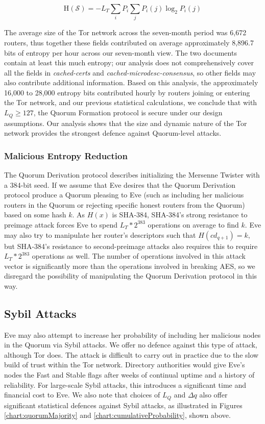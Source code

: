 \begin{equation}
\mathrm{H}(\mathcal{S}) = - L_{T} \sum_{i} P_{i} \sum_{j} P_{i}(j) \log_{2}P_{i}(j)
\label{eq:entropyRate}
\end{equation}

The average size of the Tor network across the seven-month period was 6,672 routers, thus together these fields contributed on average approximately 8,896.7 bits of entropy per hour across our seven-month view. The two documents contain at least this much entropy; our analysis does not comprehensively cover all the fields in \emph{cached-certs} and \emph{cached-microdesc-consensus}, so other fields may also contribute additional information. Based on this analysis, the approximately 16,000 to 28,000 entropy bits contributed hourly by routers joining or entering the Tor network, and our previous statistical calculations, we conclude that with $ L_{Q} \geq 127 $, the Quorum Formation protocol is secure under our design assumptions. Our analysis shows that the size and dynamic nature of the Tor network provides the strongest defence against Quorum-level attacks.

\subsubsection{Malicious Entropy Reduction}

The Quorum Derivation protocol describes initializing the Mersenne Twister with a 384-bit seed. If we assume that Eve desires that the Quorum Derivation protocol produce a Quorum pleasing to Eve (such as including her malicious routers in the Quorum or rejecting specific honest routers from the Quorum) based on some hash $ k $. As $ H(x) $ is SHA-384, SHA-384's strong resistance to preimage attack forces Eve to spend $ L_{T} * 2^{383} $ operations on average to find $ k $. Eve may also try to manipulate her router's descriptors such that $ H(\mathit{cd}_{q+1}) = k $, but SHA-384's resistance to second-preimage attacks also requires this to require $ L_{T} * 2^{383} $ operations as well. The number of operations involved in this attack vector is significantly more than the operations involved in breaking AES, so we disregard the possibility of manipulating the Quorum Derivation protocol in this way.

\subsection{Sybil Attacks}

Eve may also attempt to increase her probability of including her malicious nodes in the Quorum via Sybil attacks. We offer no defence against this type of attack, although Tor does. The attack is difficult to carry out in practice due to the slow build of trust within the Tor network. Directory authorities would give Eve's nodes the Fast and Stable flags after weeks of continual uptime and a history of reliability. For large-scale Sybil attacks, this introduces a significant time and financial cost to Eve. We also note that choices of $ L_{Q} $ and $ \Delta q $ also offer significant statistical defences against Sybil attacks, as illustrated in Figures  \ref{chart:quorumMajority} and \ref{chart:cumulativeProbability}, shown above.

